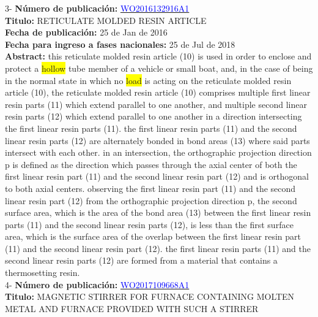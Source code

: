  \vspace{1cm}3- \textbf{Número de publicación:} \href{https://worldwide.espacenet.com/publicationDetails/biblio?DB=EPODOC&II=0&ND=3&adjacent=true&locale=en_EP&FT=D&date=20160331&CC=WO&NR=2016132916A1&KC=A1#}{\textcolor{blue}{WO2016132916A1}}\\ 
\textbf{Titulo:} RETICULATE MOLDED RESIN ARTICLE\\ 
 
\textbf{Fecha de publicación:} 25 de Jan de 2016\\ 
\textbf{Fecha para ingreso a fases nacionales:} 25 de Jul de 2018\\ 
\textbf{Abstract:} this reticulate molded resin article (10) is used in order to enclose and protect a \colorbox{yellow}{\colorbox{yellow}{hollow}} tube member of a vehicle or small boat, and, in the case of being in the normal state in which no \colorbox{yellow}{\colorbox{yellow}{\colorbox{yellow}{load}}} is acting on the reticulate molded resin article (10), the reticulate molded resin article (10) comprises multiple first linear resin parts (11) which extend parallel to one another, and multiple second linear resin parts (12) which extend parallel to one another in a direction intersecting the first linear resin parts (11). the first linear resin parts (11) and the second linear resin parts (12) are alternately bonded in bond areas (13) where said parts intersect with each other. in an intersection, the orthographic projection direction p is defined as the direction which passes through the axial center of both the first linear resin part (11) and the second linear resin part (12) and is orthogonal to both axial centers. observing the first linear resin part (11) and the second linear resin part (12) from the orthographic projection direction p, the second surface area, which is the area of the bond area (13) between the first linear resin parts (11) and the second linear resin parts (12), is less than the first surface area, which is the surface area of the overlap between the first linear resin part (11) and the second linear resin part (12). the first linear resin parts (11) and the second linear resin parts (12) are formed from a material that contains a thermosetting resin.\\ 
 

 \vspace{1cm}4- \textbf{Número de publicación:} \href{https://worldwide.espacenet.com/publicationDetails/biblio?DB=EPODOC&II=0&ND=3&adjacent=true&locale=en_EP&FT=D&date=20160331&CC=WO&NR=2017109668A1&KC=A1#}{\textcolor{blue}{WO2017109668A1}}\\ 
\textbf{Titulo:} MAGNETIC STIRRER FOR FURNACE CONTAINING MOLTEN METAL AND FURNACE PROVIDED WITH SUCH A STIRRER\\ 
 
